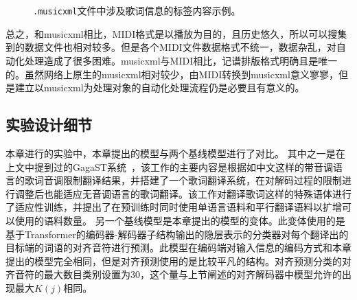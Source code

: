 \begin{figure}[ht]
    \centering
    \\
    \\
    \caption{\texttt{.musicxml}文件中涉及歌词信息的标签内容示例。}
\end{figure}
总之，和musicxml相比，MIDI格式是以播放为目的，且历史悠久，所以可以搜集到的数据文件也相对较多。但是各个MIDI文件数据格式不统一，数据杂乱，对自动化处理造成了很多困难。musicxml与MIDI相比，记谱排版格式明确且是唯一的。虽然网络上原生的musicxml相对较少，由MIDI转换到musicxml意义寥寥，但是建立以musicxml为处理对象的自动化处理流程仍是必要且有意义的。
\subsection{实验设计细节}
本章进行的实验中，本章提出的模型与两个基线模型进行了对比。
其中之一是在上文中提到过的GagaST系统~\cite{gagast}，该工作的主要内容是根据如中文这样的带音调语言的歌词音调限制翻译结果，并搭建了一个歌词翻译系统，在对解码过程的限制进行调整后也能适应无音调语言的歌词翻译。该工作对翻译歌词这样的特殊语体进行了适应性训练，并提出了在预训练时同时使用单语言语料和平行翻译语料以扩增可以使用的语料数量。
另一个基线模型是本章提出的模型的变体。此变体使用的是基于Transformer的编码器-解码器子结构输出的隐层表示的分类器对每个翻译出的目标端的词语的对齐音符进行预测。此模型在编码端对输入信息的编码方式和本章提出的模型完全相同，但是对齐预测使用的是比较平凡的结构。对齐预测分类的对齐音符的最大数目类别设置为30，这个量与上节阐述的对齐解码器中模型允许的出现最大$K(j)$相同。

